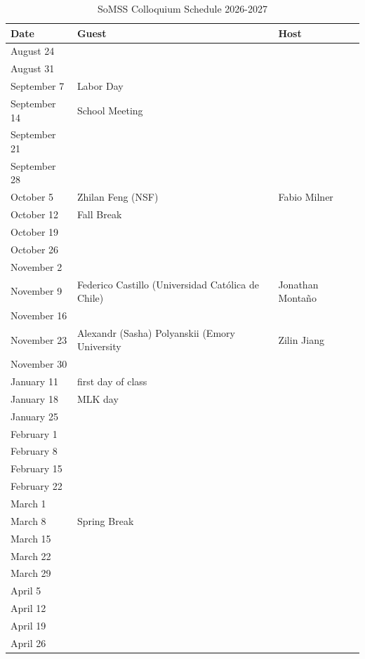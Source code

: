 \documentclass[11pt]{article}
\begin{document}


\begin{table}[htp]
\caption{SoMSS Colloquium Schedule 2026-2027}
\begin{center}
\begin{tabular}{|l|l|l|}
\hline
Date & Guest & Host\\
\hline
August 24 &&\\
August 31 &&\\
September 7 & Labor Day&\\
September 14 & School Meeting &\\
September 21 & & \\
September 28 &&\\
October 5 & Zhilan Feng (NSF) & Fabio Milner\\
October 12 & Fall Break & \\
October 19 &&\\
October 26 && \\
November 2 && \\
November 9 & Federico Castillo (Universidad Cat\'olica de Chile)  & Jonathan Monta\~no\\
November 16 && \\
November 23 &Alexandr (Sasha) Polyanskii (Emory University & Zilin Jiang \\
November 30 && \\
January 11 &  first day of class & \\
January 18 & MLK day& \\
January 25 &&\\
February 1&&\\
February 8 &&\\
February 15 & &\\
February 22 & &\\
March 1 &&\\
March 8 & Spring Break &\\
March 15 &  &\\
March 22 &&\\
March 29 && \\
April 5 && \\
April 12 && \\
April 19 && \\
April 26 && \\
\hline
\end{tabular}
\end{center}
\end{table}%
\end{document}
